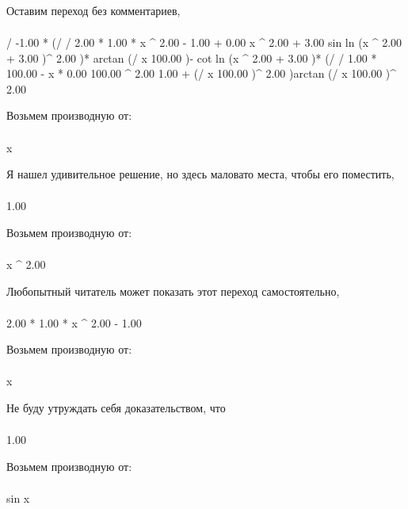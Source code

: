 Оставим переход без комментариев, 
\begin{gather}
\end{gather}
\begin{}
/ {-1.00 * (/ {/ {2.00 * 1.00 * x ^ {2.00 - 1.00 }+ 0.00 }{x ^ {2.00 }+ 3.00 }}{sin ln (x ^ {2.00 }+ 3.00 )^ {2.00 }})* arctan (/ {x }{100.00 })- cot ln (x ^ {2.00 }+ 3.00 )* (/ {/ {1.00 * 100.00 - x * 0.00 }{100.00 ^ {2.00 }}}{1.00 + (/ {x }{100.00 })^ {2.00 }})}{arctan (/ {x }{100.00 })^ {2.00 }}\\
\end{}
Возьмем производную от:
\begin{gather}
\end{gather}
\begin{}
x \\
\end{}
Я нашел удивительное решение, но здесь маловато места, чтобы его поместить, 
\begin{gather}
\end{gather}
\begin{}
1.00 \\
\end{}
Возьмем производную от:
\begin{gather}
\end{gather}
\begin{}
x ^ {2.00 }\\
\end{}
Любопытный читатель может показать этот переход самостоятельно, 
\begin{gather}
\end{gather}
\begin{}
2.00 * 1.00 * x ^ {2.00 - 1.00 }\\
\end{}
Возьмем производную от:
\begin{gather}
\end{gather}
\begin{}
x \\
\end{}
Не буду утруждать себя доказательством, что
\begin{gather}
\end{gather}
\begin{}
1.00 \\
\end{}
Возьмем производную от:
\begin{gather}
\end{gather}
\begin{}
sin x \\
\end{}
